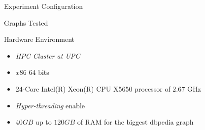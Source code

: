 \begin{frame}[fragile]{Experiment Configuration}
  \begin{block}{Graphs Tested}
    \begin{table}[H]
      \centering
     \end{table}
  \end{block}
  \begin{block}{Hardware Environment}
    \begin{itemize}
          \item \emph{HPC Cluster at UPC}
          \item $x86$ $64$ bits
          \item $24$-Core Intel(R) Xeon(R) CPU X5650 processor of $2.67$ GHz
          \item \emph{Hyper-threading} enable
          \item $40 GB$ up to $120 GB$ of RAM for the biggest \acrfull{dbpedia} graph
      \end{itemize}        
  \end{block}
\end{frame}

